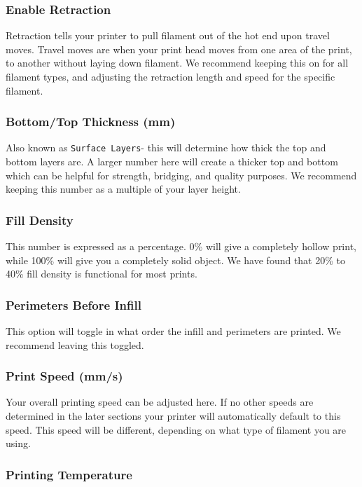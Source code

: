 \subsubsection{Enable Retraction}
Retraction tells your printer to pull filament out of the hot end upon travel moves. Travel moves are when your print head moves from one area of the print, to another without laying down filament. We recommend keeping this on for all filament types, and adjusting the retraction length and speed for the specific filament.

\subsubsection{Bottom/Top Thickness (mm)}
Also known as \texttt{Surface Layers}- this will determine how thick the top and bottom layers are. A larger number here will create a thicker top and bottom which can be helpful for strength, bridging, and quality purposes. We recommend keeping this number as a multiple of your layer height.

\subsubsection{Fill Density}
This number is expressed as a percentage. 0\% will give a completely hollow print, while 100\% will give you a completely solid object. We have found that 20\% to 40\% fill density is functional for most prints.

\subsubsection{Perimeters Before Infill}
This option will toggle in what order the infill and perimeters are printed. We recommend leaving this toggled.
\subsubsection{Print Speed (mm/s)}
Your overall printing speed can be adjusted here. If no other speeds are determined in the later sections your printer will automatically default to this speed. This speed will be different, depending on what type of filament you are using.

\subsubsection{Printing Temperature}

